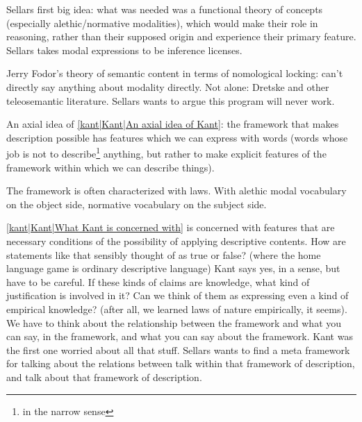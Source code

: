 Sellars first big idea: what was needed was a functional theory of concepts (especially alethic/normative modalities), which would make their role in reasoning, rather than their supposed origin and experience their primary feature. Sellars takes modal expressions to be inference licenses.


Jerry Fodor's theory of semantic content in terms of nomological locking: can't directly say anything about modality directly. Not alone: Dretske and other teleosemantic literature. Sellars wants to argue this program will never work.

An axial idea of \ref{kant|Kant|An axial idea of Kant}: the framework that makes description possible has features which we can express with words (words whose job is not to describe\footnote{in the narrow sense} anything, but rather to make explicit features of the framework within which we can describe things).

The framework is often characterized with laws. With alethic modal vocabulary on the object side, normative vocabulary on the subject side.

\ref{kant|Kant|What Kant is concerned with} is concerned with features that are necessary conditions of the possibility of applying descriptive contents. How are statements like that sensibly thought of as true or false? (where the home language game is ordinary descriptive language) Kant says yes, in a sense, but have to be careful. If these kinds of claims are knowledge, what kind of justification is involved in it? Can we think of them as expressing even a kind of empirical knowledge? (after all, we learned laws of nature empirically, it seems). We have to think about the relationship between the framework and what you can say, in the framework, and what you can say about the framework. Kant was the first one worried about all that stuff. Sellars wants to find a meta framework for talking about the relations between talk within that framework of description, and talk about that framework of description.

